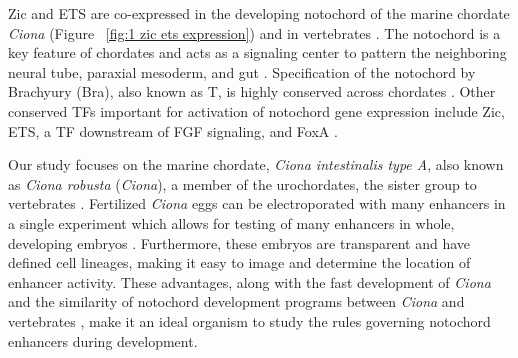 Zic and ETS are co-expressed in the developing notochord of the marine chordate \textit{Ciona} (Figure ~\ref{fig:1 zic ets expression}) and in vertebrates \cite{dykes2018,matsumoto2007a}. The notochord is a key feature of chordates and acts as a signaling center to pattern the neighboring neural tube, paraxial mesoderm, and gut \cite{herrmann1994,stemple2005}. Specification of the notochord by Brachyury (Bra), also known as T, is highly conserved across chordates \cite{chesley1935,chiba2009,wilkinson1990,yasuo1993}. Other conserved TFs important for activation of notochord gene expression include Zic, ETS, a TF downstream of FGF signaling, and FoxA \cite{ang1994,dal-pra2011,dykes2018,elms2004,imai2002,imai2002a,jose-edwards2015a,katikala2013,kumano2006,matsumoto2007a,miya2003,passamaneck2009a,schulte-merker1995,warr2008,weinstein1994,yagi2004,yasuo2007}.

Our study focuses on the marine chordate, \textit{\textit{Ciona} intestinalis type A},  also known as \textit{\textit{Ciona} robusta} (\textit{Ciona}), a member of the urochordates, the sister group to vertebrates \cite{delsuc2006}. Fertilized \textit{Ciona} eggs can be electroporated with many enhancers in a single experiment which allows for testing of many enhancers in whole, developing embryos \cite{davidson2006,farley2015a}. Furthermore, these embryos are transparent and have defined cell lineages, making it easy to image and determine the location of enhancer activity. These advantages, along with the fast development of \textit{Ciona} and the similarity of notochord development programs between \textit{Ciona} and vertebrates \cite{davidson2006,digregorio2020}, make it an ideal organism to study the rules governing notochord enhancers during development. 

